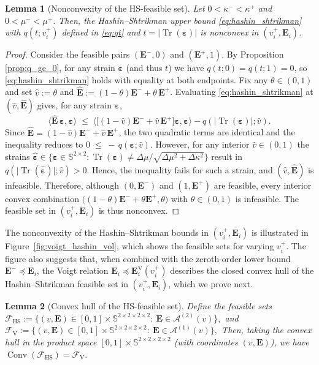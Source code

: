 \documentclass[preprint,3p]{elsarticle}
\newcommand{\tenss}[1]{\bm{\mathbf{#1}}}            %
\newcommand{\tensf}[1]{\bm{\mathbf{#1}}}            %
\newcommand{\strain}{\tenss{\varepsilon}}           %
\newcommand{\abstrstrain}{\lvert\operatorname{Tr}(\strain)\rvert}
\newcommand{\Ei}{\tensf{E}_i}                       %
\newcommand{\EV}{\tensf{E}_i^{\mathrm{V}}(v_i^+)}   %
\newcommand{\Emin}{\tensf{E}^{-}}                   %
\newcommand{\Emax}{\tensf{E}^{+}}                   %
\newcommand{\Conv}{\operatorname{Conv}}
\newcommand{\Tr}{\operatorname{Tr}}
\newtheorem{lemma}{Lemma}[section]
\begin{document}
\begin{lemma}[Nonconvexity of the HS-feasible set]\label{lem:nonconvex}
    Let $0< \kappa^- < \kappa^+$ and $0<\mu^- < \mu^+$. Then, the Hashin--Shtrikman upper bound \eqref{eq:hashin_shtrikman} with $q(t;v_i^+)$ defined in \eqref{eq:qt} and $t=\abstrstrain$ is nonconvex in $(v_i^+, \Ei)$.
\end{lemma}
\begin{proof}
    Consider the feasible pairs $(\Emin,0)$ and $(\Emax,1)$. By Proposition \ref{prop:q_ge_0}, for any strain $\strain$ (and thus $t$) we have $q(t;0)=q(t;1)=0$, so \eqref{eq:hashin_shtrikman} holds with equality at both endpoints. Fix any $\theta\in(0,1)$ and set $\widehat{v}:=\theta$ and $\widehat{\tensf{E}}:=(1-\theta)\Emin+\theta\,\Emax$. Evaluating \eqref{eq:hashin_shtrikman} at $(\widehat{v},\widehat{\tensf{E}})$ gives, for any strain $\strain$,
    \begin{equation}
    \big\langle \widehat{\tensf{E}}\,\strain,\strain\big\rangle
    \;\le\;
    \big\langle \big[(1-\widehat{v})\Emin+\widehat{v}\,\Emax\big]\strain,\strain\big\rangle
    - q(\abstrstrain;\widehat{v}).
    \end{equation}
    Since $\widehat{\tensf{E}}=(1-\widehat{v})\Emin+\widehat{v}\,\Emax$, the two quadratic terms are identical and the inequality reduces to $0 \;\le\; -\,q(\strain;\widehat{v})$. However, for any interior $\widehat{v}\in(0,1)$ the strains $\hat{\strain} \in \{\strain \in \mathbb{S}^{2\times2}: \Tr(\strain)\neq\Delta \mu /\sqrt{\Delta\mu^2 + \Delta\kappa^2}\}$ result in $q(\lvert\Tr(\hat{\strain})\rvert;\widehat{v})>0$. Hence, the inequality fails for such a strain, and $(\widehat{v},\widehat{\tensf{E}})$ is infeasible. Therefore, although $(0,\Emin)$ and $(1,\Emax)$ are feasible, every interior convex combination $\big((1-\theta) \Emin + \theta\Emax,\theta\big)$ with $\theta\in(0,1)$ is infeasible. The feasible set in $(v_i^+,\Ei)$ is thus nonconvex.
\end{proof}

The nonconvexity of the Hashin--Shtrikman bounds in $(v_i^+, \Ei)$ is illustrated in Figure~\ref{fig:voigt_hashin_vol}, which shows the feasible sets for varying $v_i^+$. The figure also suggests that, when combined with the zeroth-order lower bound $\Emin \preceq \Ei$, the Voigt relation $\Ei \preceq \EV$ describes the closed convex hull of the Hashin--Shtrikman feasible set in $(v_i^+,\Ei)$, which we prove next.

\begin{lemma}[Convex hull of the HS-feasible set]\label{lem:HS_convex_hull}
Define the feasible sets
%
$\mathcal F_{\mathrm{HS}}
:=\{(v,\tensf E)\in[0,1]\times\mathbb{S}^{2\times2\times2\times2}:\ \tensf E\in\mathcal A^{(2)}(v)\},
$
%
and
%
$
\mathcal F_{\mathrm V}
:=\{(v,\tensf E)\in[0,1]\times\mathbb{S}^{2\times2\times2\times2}:\ \tensf E\in\mathcal A^{(1)}(v)\},
$
%
Then, taking the convex hull in the product space $[0,1]\times\mathbb{S}^{2\times2\times2\times2}$ (with coordinates $(v,\tensf E)$), we have
$
\Conv(\mathcal F_{\mathrm{HS}})=\mathcal F_{\mathrm V}.
$
\end{lemma}
\end{document}
